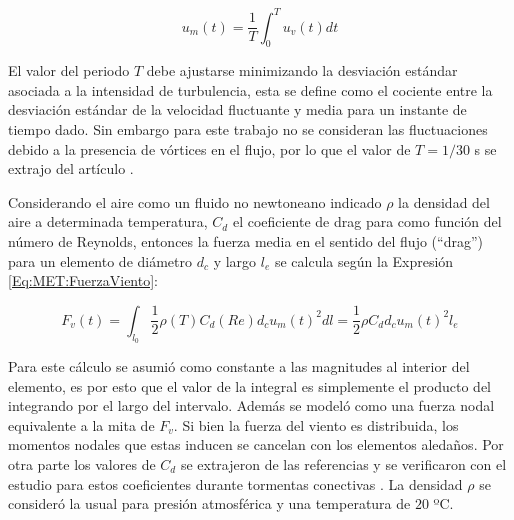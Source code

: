 \begin{equation}\label{Eq:MET:ComponentsVel}
	u_m(t)=\frac{1}{T}\int_{0}^{T}u_v(t)dt
\end{equation}


El valor del periodo $T$ debe ajustarse minimizando la desviación estándar asociada a la intensidad de turbulencia, esta se define como el cociente entre la desviación estándar de la velocidad fluctuante y  media para un instante de tiempo dado. Sin embargo para este trabajo no se consideran las fluctuaciones debido a la presencia de vórtices en el flujo, por lo que el valor de $T=1/30$ s se extrajo del artículo \citep{stengel2017measurements}.

Considerando el aire como un fluido no newtoneano indicado $\rho$ la densidad del aire a determinada temperatura, $C_d$ el coeficiente de drag para como función del número de Reynolds, entonces la fuerza media en el sentido del flujo (``drag'') para un elemento de diámetro $d_c$ y largo $l_e$ se calcula según la Expresión \eqref{Eq:MET:FuerzaViento}:

\begin{center}
	\begin{equation}
		\label{Eq:MET:FuerzaViento}
		F_v(t)=\int_{l_0}\frac{1}{2}{\rho (T)C_d(Re)d_cu_m(t)^2} dl= \frac{1}{2}\rho C_dd_cu_m(t)^2l_{e}
	\end{equation}
\end{center}



Para este cálculo se asumió como constante a las magnitudes al interior del elemento, es por esto que el valor de la integral es simplemente el producto del integrando por el largo del intervalo. Además se modeló como una fuerza nodal equivalente a la mita de $F_v$. Si bien la fuerza del viento es distribuida, los momentos nodales que estas inducen se cancelan con los elementos aledaños. Por otra parte los valores de $C_d$ se extrajeron de las referencias \citep{Foti2016} y se verificaron con el estudio para estos coeficientes durante tormentas conectivas \citep{mara2007effects}. La densidad $\rho$ se consideró la usual para presión atmosférica y una temperatura de $20$ ºC.


 

